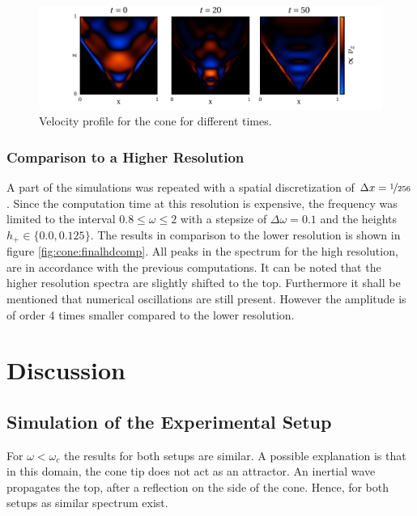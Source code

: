 \begin{figure}[!b]
  \centering
  \includegraphics{gfx/cone/final/decay/phase_decay.pdf}
  \caption{
      \label{fig:cone:decayphaseexample}
        Velocity profile for the cone for different times.
    }
\end{figure}

\subsubsection{Comparison to a Higher Resolution}

A part of the simulations was repeated with a spatial discretization of $\Delta x= \nicefrac{1}{256}$.
Since the computation time at this resolution is expensive, the frequency was limited
to the interval $0.8\leq\omega\leq2$ with a stepsize of $\Delta \omega = 0.1$ and the heights
$h_+\in\{0.0, 0.125\}$.
The results in comparison to the lower resolution is shown in figure \ref{fig:cone:finalhdcomp}.
All peaks in the spectrum for the high resolution, are in accordance with the previous computations.
It can be noted that the higher resolution spectra are slightly shifted to the top.
Furthermore it shall be mentioned that numerical oscillations  are still present.
However the amplitude is of order 4 times smaller compared to the lower resolution.


\clearpage

\section{Discussion}
\subsection{Simulation of the Experimental Setup}

For $\omega < \omega_c$ the results for both setups are similar.
A possible explanation is that in this domain, the cone tip does not act as an attractor.
An inertial wave propagates the top, after a reflection on the side of the cone.
Hence, for both setups as similar spectrum exist.

